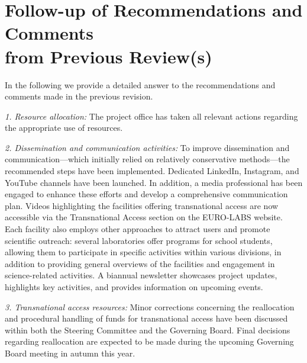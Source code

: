 
\clearpage
\section[Follow-up of Recommendations and Comments from Previous Review(s)]{\texorpdfstring{Follow-up of Recommendations and Comments\\from Previous Review(s)}{Follow-up of Recommendations and Comments from Previous Review(s)}}
\label{sec:follow-up-reviews}



In the following we provide a detailed answer to the recommendations and comments made in the previous revision. 

{\it 1. Resource allocation:}
The project office has taken all relevant actions regarding the appropriate use of resources.

{\it 2. Dissemination and communication activities:}
To improve dissemination and communication—which initially relied on relatively conservative methods—the recommended steps have been implemented. Dedicated LinkedIn, Instagram, and YouTube channels have been launched. In addition, a media professional has been engaged to enhance these efforts and develop a comprehensive communication plan. Videos highlighting the facilities offering transnational access are now accessible via the Transnational Access section on the EURO-LABS website. Each facility also employs other approaches to attract users and promote scientific outreach: several laboratories offer programs for school students, allowing them to participate in specific activities within various divisions, in addition to providing general overviews of the facilities and engagement in science-related 
activities. A biannual newsletter showcases project updates, highlights key activities, and provides information on upcoming events.

{\it 3. Transnational access resources:}
Minor corrections concerning the reallocation and procedural handling of funds for transnational access have been discussed within both the Steering Committee and the Governing Board. Final decisions regarding reallocation are expected to be made during the upcoming Governing Board meeting in autumn this year.

